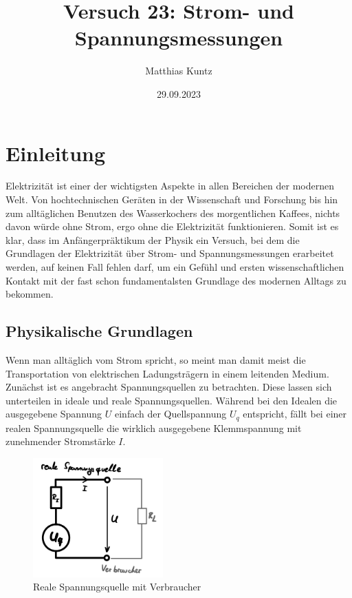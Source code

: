 \documentclass{article}
\title{Versuch 23: Strom- und Spannungsmessungen}
\author{Matthias Kuntz}
\date{29.09.2023}
\begin{document}
\maketitle

\section{Einleitung}

Elektrizität ist einer der wichtigsten Aspekte in allen Bereichen der modernen Welt. Von hochtechnischen Geräten in der Wissenschaft und Forschung bis hin zum alltäglichen Benutzen des Wasserkochers des morgentlichen Kaffees, nichts davon würde ohne Strom, ergo ohne die Elektrizität funktionieren. Somit ist es klar, dass im Anfängerpräktikum der Physik ein Versuch, bei dem die Grundlagen der Elektrizität über Strom- und Spannungsmessungen erarbeitet werden, auf keinen Fall fehlen darf, um ein Gefühl und ersten wissenschaftlichen Kontakt mit der fast schon fundamentalsten Grundlage des modernen Alltags zu bekommen.     

\subsection{Physikalische Grundlagen}

Wenn man alltäglich vom Strom spricht, so meint man damit meist die Transportation von elektrischen Ladungsträgern in einem leitenden Medium. Zunächst ist es angebracht Spannungsquellen zu betrachten. Diese lassen sich unterteilen in ideale und reale Spannungsquellen. Während bei den Idealen die ausgegebene Spannung $U$ einfach der Quellspannung $U_q$ entspricht, fällt bei einer realen Spannungsquelle die wirklich ausgegebene Klemmspannung mit zunehmender Stromstärke $I$. 

\begin{figure} [!h]
    \centering
    \includegraphics[width=5cm]{graphics/realspann.jpg}
    \caption{Reale Spannungsquelle mit Verbraucher}
    \label{fig:realspann}
\end{figure}
\end{document}
